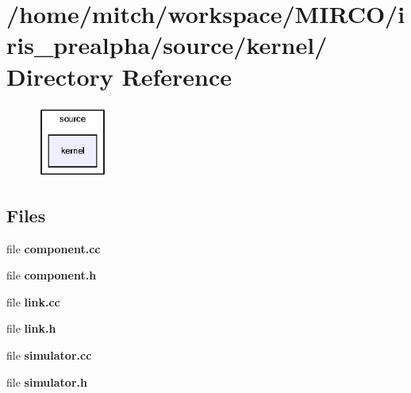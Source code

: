 \section{/home/mitch/workspace/MIRCO/iris\_\-prealpha/source/kernel/ Directory Reference}
\label{dir_e35632f9bf50cbd45122101e18671749}


\nopagebreak
\begin{figure}[H]
\begin{center}
\leavevmode
\includegraphics[width=65pt]{dir_e35632f9bf50cbd45122101e18671749_dep}
\end{center}
\end{figure}
\subsection*{Files}
\begin{CompactItemize}
\item 
file {\bf component.cc}
\item 
file {\bf component.h}
\item 
file {\bf link.cc}
\item 
file {\bf link.h}
\item 
file {\bf simulator.cc}
\item 
file {\bf simulator.h}
\end{CompactItemize}
